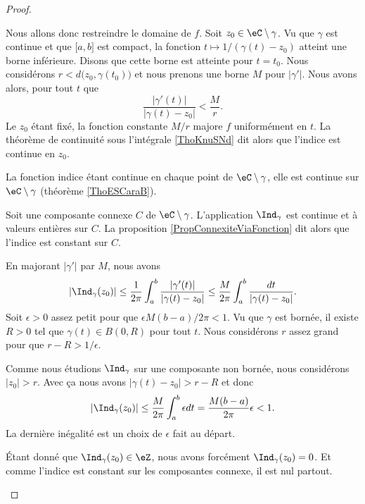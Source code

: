 \begin{proof}
\begin{subproof}
		Nous allons donc restreindre le domaine de \( f\). Soit \( z_0\in \eC\setminus\gamma\). Vu que \( \gamma\) est continue et que \( \mathopen[ a,b\mathclose]\) est compact, la fonction \( t\mapsto1/(\gamma(t)-z_0)\) atteint une borne inférieure. Disons que cette borne est atteinte pour \( t=t_0\). Nous considérons \( r<d\big( z_0,\gamma(t_0) \big)\) et nous prenons une borne \( M\) pour \( | \gamma' |\). Nous avons alors, pour tout \( t\) que
		\begin{equation}
			\frac{ | \gamma'(t) | }{ | \gamma(t)-z_0 | }<\frac{ M }{ r }.
		\end{equation}
		Le \( z_0\) étant fixé, la fonction constante \( M/r\) majore \( f\) uniformément en \( t\). La théorème de continuité sous l'intégrale \ref{ThoKnuSNd} dit alors que l'indice est continue en \( z_0\).

		La fonction indice étant continue en chaque point de \( \eC\setminus \gamma\), elle est continue sur \( \eC\setminus \gamma\) (théorème \ref{ThoESCaraB}).

		Soit une composante connexe \( C\) de \( \eC\setminus\gamma\). L'application \( \Ind_{\gamma}\) est continue et à valeurs entières sur \( C\). La proposition \ref{PropConnexiteViaFonction} dit alors que l'indice est constant sur \( C\).

		En majorant \( | \gamma' |\) par \( M\), nous avons
		\begin{equation}
			| \Ind_{\gamma}(z_0) |\leq\frac{1}{ 2\pi}\int_a^b\frac{ | \gamma'(t) | }{ | \gamma(t)-z_0 | }\leq \frac{ M }{ 2\pi }\int_a^b\frac{ dt }{ | \gamma(t)-z_0 | }.
		\end{equation}
		Soit \( \epsilon>0\) assez petit pour que \(\epsilon M(b-a)/2\pi<1\). Vu que \( \gamma\) est bornée, il existe \( R>0\) tel que \( \gamma(t)\in B(0,R)\) pour tout \( t\). Nous considérons \( r\) assez grand pour que \( r-R>1/\epsilon\).

		Comme nous étudions \( \Ind_{\gamma}\) sur une composante non bornée, nous considérons \( | z_0 |>r\). Avec ça nous avons \( | \gamma(t)-z_0 |>r-R\) et donc
		\begin{equation}
			| \Ind_{\gamma}(z_0) |\leq \frac{ M }{ 2\pi }\int_a^b\epsilon dt=\frac{ M(b-a) }{ 2\pi }\epsilon<1.
		\end{equation}
		La dernière inégalité est un choix de \( \epsilon\) fait au départ.

		Étant donné que \( \Ind_{\gamma}(z_0)\in \eZ\), nous avons forcément \( \Ind_{\gamma}(z_0)=0\). Et comme l'indice est constant sur les composantes connexe, il est nul partout.
	\end{subproof}
\end{proof}


